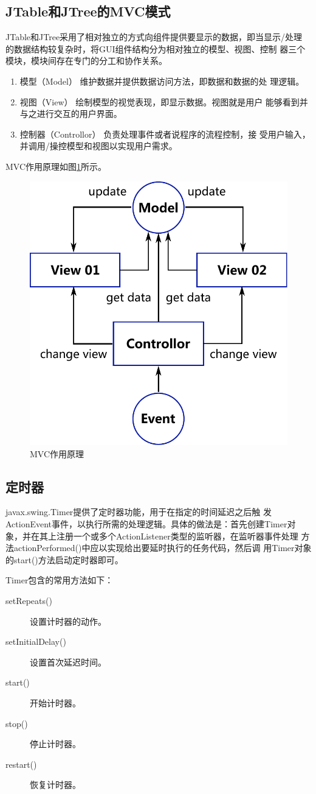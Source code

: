 \subsection{JTable和JTree的MVC模式}

JTable和JTree采用了相对独立的方式向组件提供要显示的数据，即当显示/处理
的数据结构较复杂时，将GUI组件结构分为相对独立的{\hei 模型、视图、控制
  器}三个模块，模块间存在专门的分工和协作关系。

\begin{enumerate}\kai 
\item {\hei 模型（Model）} 维护数据并提供数据访问方法，即数据和数据的处
  理逻辑。
\item {\hei 视图（View）} 绘制模型的视觉表现，即显示数据。视图就是用户
  能够看到并与之进行交互的用户界面。
\item {\hei 控制器（Controllor）} 负责处理事件或者说程序的流程控制，接
  受用户输入，并调用/操控模型和视图以实现用户需求。
\end{enumerate}

MVC作用原理如图\ref{fig:fig-GUI-MVC}所示。

\begin{figure}[htb]
\centering
\includegraphics[width=.5\textwidth]{images/Java-GUI-programming/fig-GUI-MVC.pdf}
\caption{MVC作用原理}
\label{fig:fig-GUI-MVC}
\end{figure}

\subsection{定时器}

javax.swing.Timer提供了定时器功能，用于在指定的时间延迟之后触
发ActionEvent事件，以执行所需的处理逻辑。具体的做法是：首先创建Timer对
象，并在其上注册一个或多个ActionListener类型的监听器，在监听器事件处理
方法actionPerformed()中应以实现给出要延时执行的任务代码，然后调
用Timer对象的start()方法启动定时器即可。

Timer包含的常用方法如下：

\begin{description}
\item[setRepeats()] 设置计时器的动作。
\item[setInitialDelay()] 设置首次延迟时间。
\item[start()] 开始计时器。
\item[stop()] 停止计时器。
\item[restart()] 恢复计时器。
\end{description}


